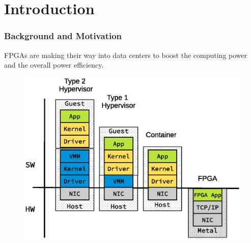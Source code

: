 \section{Introduction}
\begin{frame}
  \frametitle{Background and Motivation}

FPGAs are making their way into data centers to boost the computing power
	and the overall power efficiency.



\begin{figure}
	\centering
\includegraphics[scale=0.5]{./background/server_configuration.eps}
\end{figure}


\end{frame}


